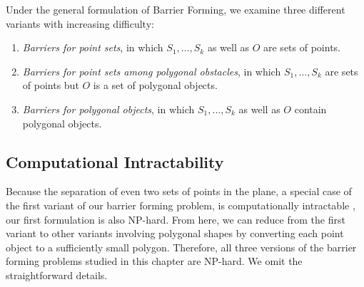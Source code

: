 Under the general formulation of Barrier Forming, we examine three different variants with increasing difficulty:
\begin{enumerate} 
\item \emph{Barriers for point sets}, in which  $S_1, \dots, S_k$ as well as $O$ are sets of points. 
\item \emph{Barriers for point sets among polygonal obstacles}, in which  $S_1, \dots, S_k$ are sets of points but $O$ is a set of polygonal objects. 
\item \emph{Barriers for polygonal objects}, in which $S_1, \dots, S_k$ as well as $O$ contain polygonal objects. 
\end{enumerate}

\subsection{Computational Intractability}
Because the separation of even two sets of points in the plane, 
a special case of the first variant of our barrier forming problem, 
is computationally intractable \cite{demaine2005separating}, 
our first formulation is also NP-hard. 
From here, we can reduce from the first variant to other variants involving polygonal shapes by converting each point object to a sufficiently small polygon. 
Therefore, all three versions of the barrier forming problems studied in this chapter are NP-hard. We omit the straightforward details. 